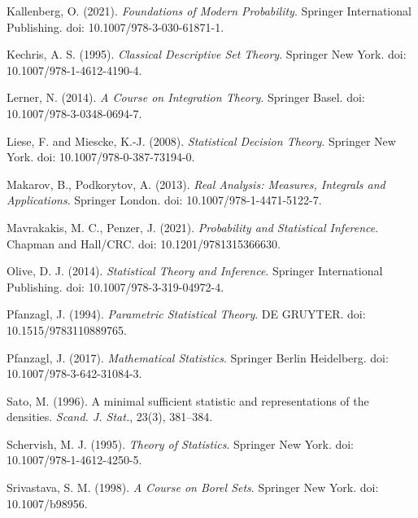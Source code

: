 \documentclass[12pt]{article}
\begin{document}
\begin{thebibliography}{}
Kallenberg, O. (2021).
\newblock \emph{Foundations of Modern Probability}.
\newblock Springer International Publishing. doi: 10.1007/978-3-030-61871-1.

Kechris, A. S. (1995).
\newblock \emph{Classical Descriptive Set Theory}.
\newblock Springer New York. doi: 10.1007/978-1-4612-4190-4.

Lerner, N. (2014).
\newblock \emph{A Course on Integration Theory}.
\newblock Springer Basel. doi: 10.1007/978-3-0348-0694-7.

Liese, F. and Miescke, K.-J. (2008).
\newblock \emph{Statistical Decision Theory}.
\newblock Springer New York. doi: 10.1007/978-0-387-73194-0.

Makarov, B., Podkorytov, A. (2013).
\newblock \emph{Real Analysis: Measures, Integrals and Applications}.
\newblock Springer London. doi: 10.1007/978-1-4471-5122-7.

Mavrakakis, M. C., Penzer, J. (2021).
\newblock \emph{Probability and Statistical Inference}.
\newblock Chapman and Hall/CRC. doi: 10.1201/9781315366630.

Olive, D. J. (2014).
\newblock \emph{Statistical Theory and Inference}.
\newblock Springer International Publishing. doi: 10.1007/978-3-319-04972-4.

Pfanzagl, J. (1994).
\newblock \emph{Parametric Statistical Theory}.
\newblock DE GRUYTER. doi: 10.1515/9783110889765.

Pfanzagl, J. (2017).
\newblock \emph{Mathematical Statistics}.
\newblock Springer Berlin Heidelberg. doi: 10.1007/978-3-642-31084-3.

Sato, M. (1996).
\newblock A minimal sufficient statistic and representations of the densities.
\newblock \emph{Scand. J. Stat.}, 23(3), 381--384.

Schervish, M. J. (1995).
\newblock \emph{Theory of Statistics}.
\newblock Springer New York. doi: 10.1007/978-1-4612-4250-5.

Srivastava, S. M. (1998).
\newblock \emph{A Course on Borel Sets}.
\newblock Springer New York. doi: 10.1007/b98956.


\end{thebibliography}
\end{document}
